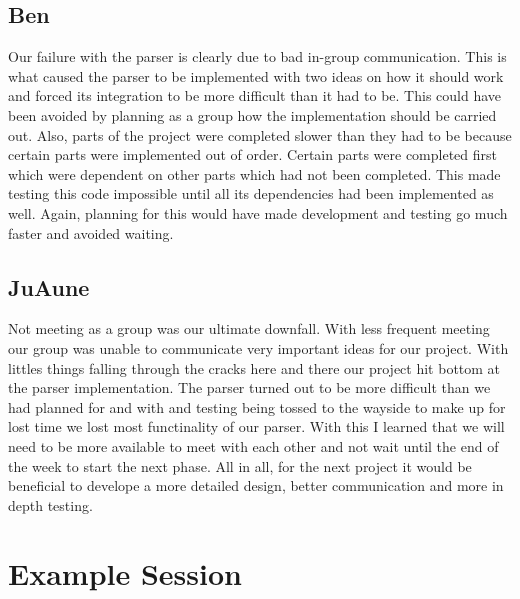 \documentclass{article}
\begin{document}
\subsection{Ben}Our failure with the parser is clearly due to bad in-group communication. This is what caused the
parser to be implemented with two ideas on how it should work and forced its integration to be more difficult than
it had to be. This could have been avoided by planning as a group how the implementation should be carried out. Also,
parts of the project were completed slower than they had to be because certain parts were implemented out of order.
Certain parts were completed first which were dependent on other parts which had not been completed. This made testing
this code impossible until all its dependencies had been implemented as well. Again, planning for this would have made
development and testing go much faster and avoided waiting. 


\subsection{JuAune} Not meeting as a group was our ultimate downfall. With less frequent meeting our group was unable to 
communicate very important ideas for our project. With littles things falling through the cracks here and there our 
project hit bottom at the parser implementation. The parser turned out to be more difficult than we had planned for and 
with and testing being tossed to the wayside to make up for lost time we lost most functinality of our parser. With this 
I learned that we will need to be more available to meet with each other and not wait until the end of the week to start 
the next phase. All in all, for the next project it would be beneficial to develope a more detailed design, better 
communication and more in depth testing.

\section{Example Session}
\end{document}
